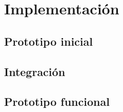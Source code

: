 \chapter{Implementación}

\section{Prototipo inicial}


\section{Integración}


\section{Prototipo funcional}

